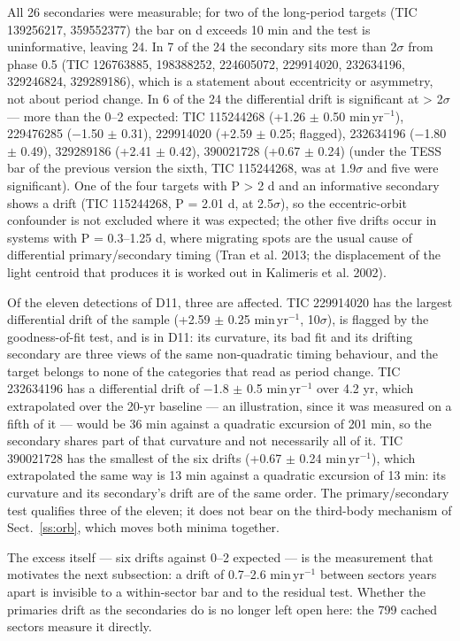 \documentclass{aa}
\begin{document}
All 26 secondaries were measurable; for two of the long-period targets (TIC 139256217, 359552377) the bar on d exceeds 10 min and the test is uninformative, leaving 24. In 7 of the 24 the secondary sits more than 2$\sigma$ from phase 0.5 (TIC 126763885, 198388252, 224605072, 229914020, 232634196, 329246824, 329289186), which is a statement about eccentricity or asymmetry, not about period change. In 6 of the 24 the differential drift is significant at > 2$\sigma$ --- more than the 0--2 expected: TIC 115244268 (+1.26 $\pm$ 0.50 min\,yr$^{-1}$), 229476285 ($-$1.50 $\pm$ 0.31), 229914020 (+2.59 $\pm$ 0.25; flagged), 232634196 ($-$1.80 $\pm$ 0.49), 329289186 (+2.41 $\pm$ 0.42), 390021728 (+0.67 $\pm$ 0.24) (under the TESS bar of the previous version the sixth, TIC 115244268, was at 1.9$\sigma$ and five were significant). One of the four targets with P > 2 d and an informative secondary shows a drift (TIC 115244268, P = 2.01 d, at 2.5$\sigma$), so the eccentric-orbit confounder is not excluded where it was expected; the other five drifts occur in systems with P = 0.3--1.25 d, where migrating spots are the usual cause of differential primary/secondary timing (Tran et al. 2013; the displacement of the light centroid that produces it is worked out in Kalimeris et al. 2002).

Of the eleven detections of D11, three are affected. TIC 229914020 has the largest differential drift of the sample (+2.59 $\pm$ 0.25 min\,yr$^{-1}$, 10$\sigma$), is flagged by the goodness-of-fit test, and is in D11: its curvature, its bad fit and its drifting secondary are three views of the same non-quadratic timing behaviour, and the target belongs to none of the categories that read as period change. TIC 232634196 has a differential drift of $-$1.8 $\pm$ 0.5 min\,yr$^{-1}$ over 4.2 yr, which extrapolated over the 20-yr baseline --- an illustration, since it was measured on a fifth of it --- would be 36 min against a quadratic excursion of 201 min, so the secondary shares part of that curvature and not necessarily all of it. TIC 390021728 has the smallest of the six drifts (+0.67 $\pm$ 0.24 min\,yr$^{-1}$), which extrapolated the same way is 13 min against a quadratic excursion of 13 min: its curvature and its secondary's drift are of the same order. The primary/secondary test qualifies three of the eleven; it does not bear on the third-body mechanism of Sect.~\ref{ss:orb}, which moves both minima together.

The excess itself --- six drifts against 0--2 expected --- is the measurement that motivates the next subsection: a drift of 0.7--2.6 min\,yr$^{-1}$ between sectors years apart is invisible to a within-sector bar and to the residual test. Whether the primaries drift as the secondaries do is no longer left open here: the 799 cached sectors measure it directly.
\end{document}

